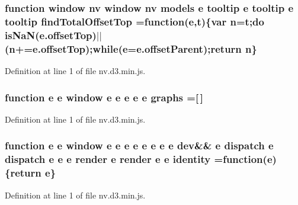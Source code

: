 \subsubsection[{find\+Total\+Offset\+Top}]{\setlength{\rightskip}{0pt plus 5cm}function {\bf window} {\bf nv} {\bf window} {\bf nv} {\bf models} {\bf e} {\bf tooltip} {\bf e} {\bf tooltip} {\bf e} {\bf tooltip} find\+Total\+Offset\+Top =function({\bf e},t)\{var {\bf n}=t;do is\+Na\+N(e.\+offset\+Top)$\vert$$\vert$({\bf n}+=e.\+offset\+Top);while({\bf e}=e.\+offset\+Parent);{\bf return} {\bf n}\}}\label{nv_8d3_8min_8js_acb2dbc81ed2a37fd99d1bc1502f08b73}


Definition at line 1 of file nv.\+d3.\+min.\+js.

\subsubsection[{graphs}]{\setlength{\rightskip}{0pt plus 5cm}function {\bf e} {\bf e} {\bf window} {\bf e} {\bf e} {\bf e} {\bf e} {\bf e} graphs =[$\,$]}\label{nv_8d3_8min_8js_a06519adbf6b039bca6abcc26fa0b858e}


Definition at line 1 of file nv.\+d3.\+min.\+js.

\subsubsection[{identity}]{\setlength{\rightskip}{0pt plus 5cm}function {\bf e} {\bf e} {\bf window} {\bf e} {\bf e} {\bf e} {\bf e} {\bf e} {\bf e} {\bf e} {\bf e} {\bf dev}\&\& {\bf e} {\bf dispatch} {\bf e} {\bf dispatch} {\bf e} {\bf e} {\bf e} {\bf render} {\bf e} {\bf render} {\bf e} {\bf e} identity =function({\bf e})\{{\bf return} {\bf e}\}}\label{nv_8d3_8min_8js_ab26977296fb5de1e31d8c3102cc2e2ed}


Definition at line 1 of file nv.\+d3.\+min.\+js.

